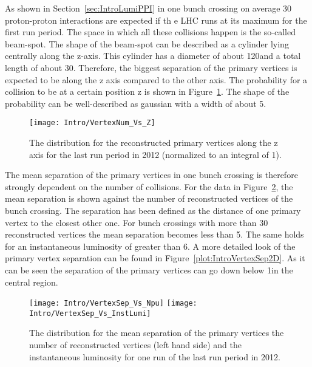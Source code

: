 As shown in Section~\ref{sec:IntroLumiPPI} in one bunch crossing on average 30 proton-proton interactions are expected if th e LHC runs at its maximum for the first run period. The space in which all these collisions happen is the so-called beam-spot. The shape of the beam-spot can be described as a cylinder lying centrally along the z-axis. This cylinder has a diameter of about 120\mum and a total length of about 30\cm. Therefore, the biggest separation of the primary vertices is expected to be along the z axis compared to the other axis. The probability for a collision to be at a certain position z is shown in Figure~\ref{plot:IntroVertexPos}. The shape of the probability can be well-described as gaussian with a width of about 5\cm.

\begin{figure}[!Hhtb]
    \centering
    \texttt{[image: Intro/VertexNum\_Vs\_Z]}
    \caption[Vertex distribution along z]{The distribution for the reconstructed primary vertices along the z axis for the last run period in 2012 (normalized to an integral of 1). \label{plot:IntroVertexPos}}
\end{figure}

The mean separation of the primary vertices in one bunch crossing is therefore strongly dependent on the number of collisions. For the data in Figure~\ref{plot:IntroVertexSep}, the mean separation is shown against the number of reconstructed vertices of the bunch crossing. The separation has been defined as the distance of one primary vertex to the closest other one. For bunch crossings with more than 30 reconstructed vertices the mean separation becomes less than 5\mm. The same holds for an instantaneous luminosity of greater than 6\hertzpernbarn. A more detailed look of the primary vertex separation can be found in Figure~\ref{plot:IntroVertexSep2D}. As it can be seen the separation of the primary vertices can go down below 1\mm in the central region.

\begin{figure}[!Hhtb]
    \centering
    \texttt{[image: Intro/VertexSep\_Vs\_Npu]}
    \texttt{[image: Intro/VertexSep\_Vs\_InstLumi]}
    \caption[Mean vertex separation \vs number of reconstructed vertices and \vs instantaneous luminosity]{The distribution for the mean separation of the primary vertices \vs the number of reconstructed vertices (left hand side) and \vs the instantaneous luminosity for one run of the last run period in 2012. \label{plot:IntroVertexSep}}
\end{figure}

